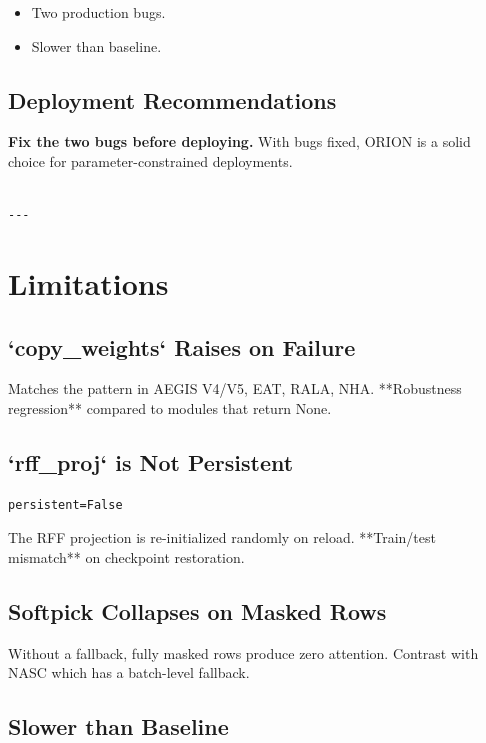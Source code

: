 \begin{itemize}
\item Two production bugs.
\item Slower than baseline.

\end{itemize}
\subsection{Deployment Recommendations}

\textbf{Fix the two bugs before deploying.} With bugs fixed, ORION is a solid 
choice for parameter-constrained deployments.
\begin{lstlisting}

---
\end{lstlisting}


\section{Limitations}

\subsection{`copy\_weights` Raises on Failure}

Matches the pattern in AEGIS V4/V5, EAT, RALA, NHA. **Robustness 
regression** compared to modules that return None.

\subsection{`rff\_proj` is Not Persistent}

\begin{lstlisting}
persistent=False
\end{lstlisting}

The RFF projection is re-initialized randomly on reload. **Train/test 
mismatch** on checkpoint restoration.

\subsection{Softpick Collapses on Masked Rows}

Without a fallback, fully masked rows produce zero attention. Contrast 
with NASC which has a batch-level fallback.

\subsection{Slower than Baseline}

